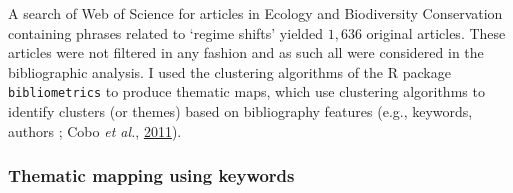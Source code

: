 \documentclass[12pt,twoside,openany]{reedthesis}
\begin{document}
A search of Web of Science for articles in Ecology and Biodiversity Conservation containing phrases related to `regime shifts' yielded \(1,636\) original articles. These articles were not filtered in any fashion and as such all were considered in the bibliographic analysis. I used the clustering algorithms of the R package \texttt{bibliometrics} to produce thematic maps, which use clustering algorithms to identify clusters (or themes) based on bibliography features (e.g., keywords, authors ; Cobo \emph{et al.}, \protect\hyperlink{ref-cobo2011approach}{2011}).

\hypertarget{thematic-mapping-using-keywords}{%
\subsubsection{Thematic mapping using keywords}\label{thematic-mapping-using-keywords}}
\end{document}
